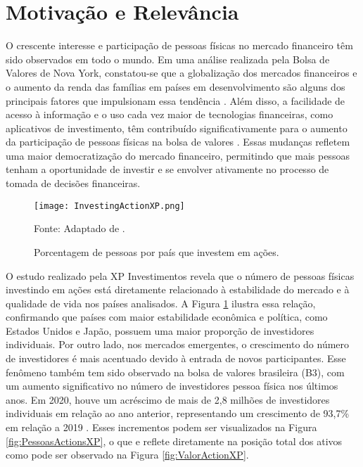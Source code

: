\section{Motivação e Relevância}
\label{subsec:motivação}
O crescente interesse e participação de pessoas físicas no mercado financeiro têm sido observados em todo o mundo. Em uma análise realizada pela Bolsa de Valores de Nova York, constatou-se que a globalização dos mercados financeiros e o aumento da renda das famílias em países em desenvolvimento são alguns dos principais fatores que impulsionam essa tendência \cite{KANIEL_Individual}. Além disso, a facilidade de acesso à informação e o uso cada vez maior de tecnologias financeiras, como aplicativos de investimento, têm contribuído significativamente para o aumento da participação de pessoas físicas na bolsa de valores \cite{UNCTAD2020}. Essas mudanças refletem uma maior democratização do mercado financeiro, permitindo que mais pessoas tenham a oportunidade de investir e se envolver ativamente no processo de tomada de decisões financeiras.

\begin{figure}
    \caption{Porcentagem de pessoas por país que investem em ações.}
      \centering
      \texttt{[image: InvestingActionXP.png]} 
      
      Fonte: Adaptado de .
    \label{fig:investPerCountry}
\end{figure}

O estudo realizado pela XP Investimentos \cite{XP:2023} revela que o número de pessoas físicas investindo em ações está diretamente relacionado à estabilidade do mercado e à qualidade de vida nos países analisados. A Figura \ref{fig:investPerCountry} ilustra essa relação, confirmando que países com maior estabilidade econômica e política, como Estados Unidos e Japão, possuem uma maior proporção de investidores individuais. Por outro lado, nos mercados emergentes, o crescimento do número de investidores é mais acentuado devido à entrada de novos participantes. Esse fenômeno também tem sido observado na bolsa de valores brasileira (B3), com um aumento significativo no número de investidores pessoa física nos últimos anos. Em 2020, houve um acréscimo de mais de 2,8 milhões de investidores individuais em relação ao ano anterior, representando um crescimento de 93,7\% em relação a 2019 \cite{B3:2023}. Esses incrementos podem ser visualizados na Figura \ref{fig:PessoasActionsXP}, o que e reflete diretamente na posição total dos ativos como pode ser observado na Figura \ref{fig:ValorActionXP}.

